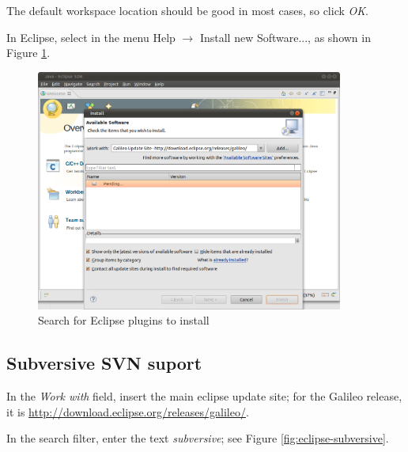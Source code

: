 \documentclass[a4paper, 10pt]{article}
\begin{document}
The default workspace location should be good in most cases, so click \emph{OK}.

In Eclipse, select in the menu Help $\rightarrow$ Install new Software..., as shown in
Figure \ref{fig:eclipse-update}.

    \begin{figure}[H]
    \centering
        \includegraphics[width=0.9\textwidth]{./png-install-guide/eclipse-update.png}
        \caption{Search for Eclipse plugins to install}
        \label{fig:eclipse-update}
    \end{figure}




\subsection{Subversive SVN suport}


In the \emph{Work with} field, insert the main eclipse update site;
for the Galileo release, it is
\url{http://download.eclipse.org/releases/galileo/}.

In the search filter, enter the text \emph{subversive};
see Figure \ref{fig:eclipse-subversive}.
\end{document}
